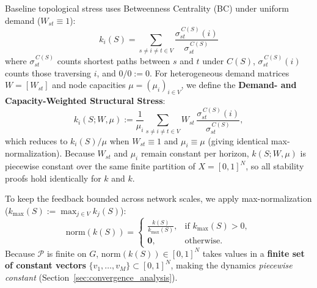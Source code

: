 \documentclass{ccjnl}
\newcommand{\rev}[1]{#1}
\def\rev#1{#1}%
\def\widetilde#1{#1}%
\def\kappa{k}%
\begin{document}
Baseline topological stress uses Betweenness Centrality (BC) \cite{Brandes2001Faster} under uniform demand ($W_{st} \equiv 1$):
\begin{equation}
    \label{eq:bc_definition}
    \kappa_i(S) = \sum_{s\neq i\neq t\in V} \frac{\sigma^{\,C(S)}_{st}(i)}{\sigma^{\,C(S)}_{st}}
\end{equation}
where $\sigma^{\,C(S)}_{st}$ counts shortest paths between $s$ and $t$ under $C(S)$, $\sigma^{\,C(S)}_{st}(i)$ counts those traversing $i$, \rev{and $0/0 := 0$}.
\rev{For heterogeneous demand matrices $W = [W_{st}]$ and node capacities $\mu = (\mu_i)_{i \in V}$, we define the \textbf{Demand- and Capacity-Weighted Structural Stress}:
\begin{equation}
    \label{eq:generalized_stress}
    \widetilde{\kappa}_i(S; W, \mu) := \frac{1}{\mu_i} \sum_{s\neq i\neq t\in V} W_{st}\,\frac{\sigma^{\,C(S)}_{st}(i)}{\sigma^{\,C(S)}_{st}},
\end{equation}
which reduces to $\kappa_i(S)/\mu$ when $W_{st}\equiv 1$ and $\mu_i \equiv \mu$ (giving identical max-normalization). Because $W_{st}$ and $\mu_i$ remain constant per horizon, $\widetilde{\kappa}(S; W, \mu)$ is piecewise constant over the same finite partition of $X=[0,1]^N$, so all stability proofs hold identically for $\kappa$ and $\widetilde{\kappa}$.}

To keep the feedback bounded across network scales, we apply max-normalization ($\kappa_{\max}(S) := \max_{j \in V} \kappa_j(S)$):
\begin{equation}
    \label{eq:bc_normalization}
    \mathrm{norm}(\kappa(S)) =
    \begin{cases}
    \displaystyle \frac{\kappa(S)}{\kappa_{\max}(S)}, & \text{if } \kappa_{\max}(S) > 0,\\[6pt]
    \mathbf{0}, & \text{otherwise.}
    \end{cases}
\end{equation}
Because $\mathcal{P}$ is finite on $G$, $\mathrm{norm}(\kappa(S)) \in [0,1]^N$ takes values in a \textbf{finite set of constant vectors} \rev{$\{v_1, \dots, v_M\} \subset [0,1]^N$}, making the dynamics \textit{piecewise constant} (Section~\ref{sec:convergence_analysis}).
\end{document}
